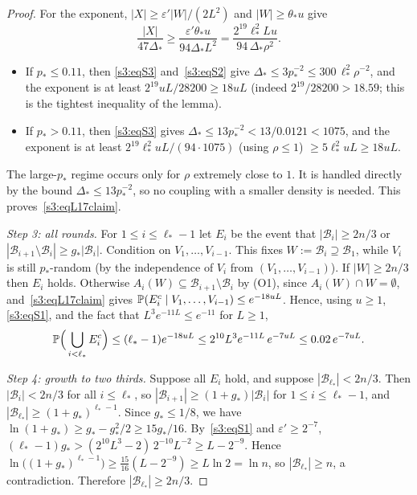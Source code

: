 \begin{proof}
For the exponent, $|X|\ge\varepsilon'|W|/(2L^2)$ and $|W|\ge\theta_*u$
give
\[
\frac{|X|}{47\Delta_*}\ge\frac{\varepsilon'\theta_*u}{94\Delta_*L^2}=\frac{2^{19}\ell_*^2Lu}{94\,\Delta_*\rho^2}.
\]
\begin{itemize}
\item If $p_*\le0.11$, then \ref{s3:eqS3} and~\ref{s3:eqS2} give
  $\Delta_*\le3p_*^{-2}\le300\,\ell_*^2\rho^{-2}$, and the exponent is at
  least $2^{19}uL/28200\ge18uL$ (indeed $2^{19}/28200>18.59$; this is the
  tightest inequality of the lemma).
\item If $p_*>0.11$, then \ref{s3:eqS3} gives
  $\Delta_*\le13p_*^{-2}<13/0.0121<1075$, and the exponent is at least
  $2^{19}\ell_*^2uL/(94\cdot1075)$ (using $\rho\le1$) $\ge5\ell_*^2uL\ge18uL$.
\end{itemize}
The large-$p_*$ regime occurs only for $\rho$ extremely close to $1$. It
is handled directly by the bound $\Delta_*\le13p_*^{-2}$, so no coupling
with a smaller density is needed. This proves~\eqref{s3:eqL17claim}.

\smallskip\noindent\emph{Step 3: all rounds.} For $1\le i\le\ell_*-1$ let
$E_i$ be the event that $|\mathcal B_i|\ge2n/3$ or
$|\mathcal B_{i+1}\setminus\mathcal B_i|\ge g_*|\mathcal B_i|$. Condition
on $V_1,\dots,V_{i-1}$. This fixes $W:=\mathcal B_i\supseteq\mathcal B_1$,
while $V_i$ is still $p_*$-random (by the independence of $V_i$ from
$(V_1,\dots,V_{i-1})$). If $|W|\ge2n/3$ then $E_i$ holds.
Otherwise $A_i(W)\subseteq\mathcal B_{i+1}\setminus\mathcal B_i$ by (O1),
since $A_i(W)\cap W=\emptyset$, and~\eqref{s3:eqL17claim} gives
$\mathbb{P}(E_i^c\mid V_1,\dots,V_{i-1})\le e^{-18uL}$. Hence, using $u\ge1$,
\ref{s3:eqS1}, and the fact that $L^3e^{-11L}\le e^{-11}$ for $L\ge1$,
\[
\mathbb{P}\Big(\bigcup_{i<\ell_*}E_i^c\Big)\le(\ell_*-1)e^{-18uL}\le2^{10}L^3e^{-11L}\,e^{-7uL}\le0.02\,e^{-7uL}.
\]

\smallskip\noindent\emph{Step 4: growth to two thirds.} Suppose all
$E_i$ hold, and suppose $|\mathcal B_{\ell_*}|<2n/3$. Then
$|\mathcal B_i|<2n/3$ for all $i\le\ell_*$, so
$|\mathcal B_{i+1}|\ge(1+g_*)|\mathcal B_i|$ for $1\le i\le\ell_*-1$, and
$|\mathcal B_{\ell_*}|\ge(1+g_*)^{\ell_*-1}$. Since $g_*\le1/8$, we have
$\ln(1+g_*)\ge g_*-g_*^2/2\ge15g_*/16$. By~\ref{s3:eqS1} and
$\varepsilon'\ge2^{-7}$,
$(\ell_*-1)g_*>(2^{10}L^3-2)\,2^{-10}L^{-2}\ge L-2^{-9}$. Hence
$\ln\big((1+g_*)^{\ell_*-1}\big)\ge\tfrac{15}{16}(L-2^{-9})\ge L\ln2=\ln n$,
so $|\mathcal B_{\ell_*}|\ge n$, a contradiction. Therefore
$|\mathcal B_{\ell_*}|\ge2n/3$.


\end{proof}
